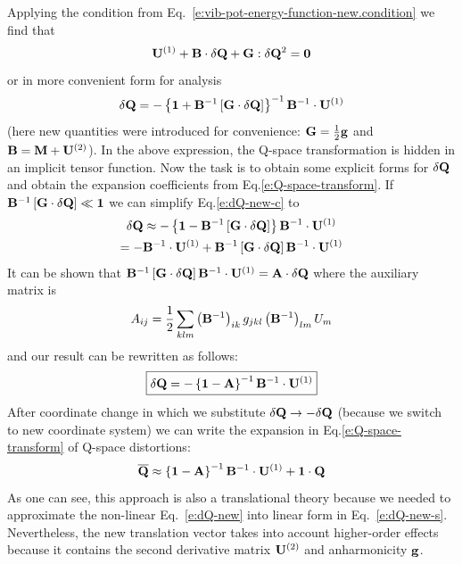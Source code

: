 \documentclass[b5paper,oneside,fleqn,11pt]{book}
\begin{document}
\begin{refsection}
Applying the condition from Eq.~\eqref{e:vib-pot-energy-function-new.condition} we find that
%
\begin{equation}\label{e:dQ-new}
{\bf U}^{(1)} + {\bf B} \cdot \delta {\bf Q} + {\bf G} : \delta{\bf Q}^2 = {\bf 0}
\end{equation}
%
or in more convenient form for analysis
%
\begin{equation}\label{e:dQ-new-c}
\delta {\bf Q} = 
-\left\{ 
       {\bf 1} + {\bf B}^{-1} \left[ {\bf G} \cdot \delta {\bf Q} \right]
\right\}^{-1} {\bf B}^{-1} \cdot {\bf U}^{(1)}
\end{equation}
%
(here new quantities were introduced for convenience: ${\bf G} = \frac{1}{2} {\bf g}$
and ${\bf B} = {\bf M} + {\bf U}^{(2)}$). 
In the above expression, the Q-space transformation is hidden in an implicit tensor
function.
Now the task is to obtain some explicit forms for $\delta {\bf Q}$ and
obtain the expansion coefficients from Eq.\eqref{e:Q-space-transform}.
%
If~${\bf B}^{-1} \left[ {\bf G} \cdot \delta {\bf Q} \right] \ll {\bf 1} $ 
we can simplify Eq.\eqref{e:dQ-new-c} to
%
\begin{multline}\label{e:dQ-new-s}
\delta {\bf Q} \approx
-\left\{ 
       {\bf 1} - {\bf B}^{-1} \left[ {\bf G} \cdot \delta {\bf Q} \right]
\right\} {\bf B}^{-1} \cdot {\bf U}^{(1)} \\ = 
%
- {\bf B}^{-1} \cdot {\bf U}^{(1)} + {\bf B}^{-1} \left[ {\bf G} \cdot \delta {\bf Q} \right] {\bf B}^{-1} \cdot {\bf U}^{(1)}
\end{multline}
%
It can be shown that 
${\bf B}^{-1} \left[ {\bf G} \cdot \delta {\bf Q} \right] {\bf B}^{-1} \cdot {\bf U}^{(1)} = {\bf A} \cdot \delta {\bf Q}$
where the auxiliary matrix is
%
\begin{equation}\label{e:A}
A_{ij} = \frac{1}{2}\sum_{klm} 
   \left( {\bf B}^{-1} \right)_{ik} g_{jkl} \left( {\bf B}^{-1} \right)_{lm} 
U_m
\end{equation}
%
and our result can be rewritten as follows:
%
\begin{equation}\label{e:dQ-T1}
\boxed{
\delta {\bf Q} = -  \left\{ {\bf 1} - {\bf A} \right\}^{-1} {\bf B}^{-1} \cdot {\bf U}^{(1)}
}
\end{equation}
%
After coordinate change in which we substitute $\delta {\bf Q}\rightarrow -\delta {\bf Q}$
(because we switch to new coordinate system) we can write the expansion in Eq.\eqref{e:Q-space-transform} 
of Q-space distortions:
\begin{equation}\label{e:Q-new-T1}
{\bf \overline{Q}} \approx  \left\{ {\bf 1} - {\bf A} \right\}^{-1} {\bf B}^{-1} \cdot {\bf U}^{(1)} + {\bf 1} \cdot {\bf Q}
\end{equation}
%
As one can see, this approach is also a translational theory because 
we needed to approximate the non\hyp{}linear Eq.~\eqref{e:dQ-new} into
linear form in Eq.~\eqref{e:dQ-new-s}.
Nevertheless, the new translation vector takes into account
higher\hyp{}order effects because it contains the second derivative matrix ${\bf U}^{(2)}$
and anharmonicity $\bf g$.


\end{refsection}
\end{document}
